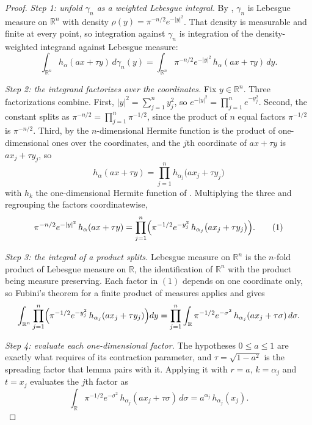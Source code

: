 \begin{proof}
\emph{Step 1: unfold $\gamma_n$ as a weighted Lebesgue integral.}
By , $\gamma_n$ is Lebesgue measure on $\mathbb{R}^n$ with
density $\rho(y) = \pi^{-n/2}e^{-|y|^2}$.  That density is measurable and finite
at every point, so integration against $\gamma_n$ is integration of the
density-weighted integrand against Lebesgue measure:
\[
  \int_{\mathbb{R}^n} h_\alpha(a x + \tau y)\, d\gamma_n(y)
    = \int_{\mathbb{R}^n} \pi^{-n/2} e^{-|y|^2}\, h_\alpha(a x + \tau y)\, dy .
\]

\emph{Step 2: the integrand factorizes over the coordinates.}
Fix $y \in \mathbb{R}^n$.  Three factorizations combine.  First,
$|y|^2 = \sum_{j=1}^n y_j^2$, so
$e^{-|y|^2} = \prod_{j=1}^n e^{-y_j^2}$.  Second, the constant splits as
$\pi^{-n/2} = \prod_{j=1}^n \pi^{-1/2}$, since the product of $n$ equal factors
$\pi^{-1/2}$ is $\pi^{-n/2}$.  Third, by  the
$n$-dimensional Hermite function is the product of one-dimensional ones over the
coordinates, and the $j$th coordinate of $a x + \tau y$ is $a x_j + \tau y_j$,
so
\[
  h_\alpha(a x + \tau y)
    = \prod_{j=1}^n h_{\alpha_j}\bigl(a x_j + \tau y_j\bigr)
\]
with $h_k$ the one-dimensional Hermite function of .
Multiplying the three and regrouping the factors coordinatewise,
\begin{equation*}
  \pi^{-n/2} e^{-|y|^2}\, h_\alpha(a x + \tau y)
    = \prod_{j=1}^n \Bigl( \pi^{-1/2} e^{-y_j^2}\,
        h_{\alpha_j}\bigl(a x_j + \tau y_j\bigr) \Bigr) . \tag{1}
\end{equation*}

\emph{Step 3: the integral of a product splits.}
Lebesgue measure on $\mathbb{R}^n$ is the $n$-fold product of Lebesgue measure on
$\mathbb{R}$, the identification of $\mathbb{R}^n$ with the product being measure
preserving.  Each factor in $(1)$ depends on one coordinate only, so Fubini's
theorem for a finite product of measures applies and gives
\[
  \int_{\mathbb{R}^n} \prod_{j=1}^n \Bigl( \pi^{-1/2} e^{-y_j^2}\,
      h_{\alpha_j}(a x_j + \tau y_j)\Bigr) dy
  = \prod_{j=1}^n \int_{\mathbb{R}} \pi^{-1/2} e^{-\sigma^2}\,
      h_{\alpha_j}(a x_j + \tau \sigma)\, d\sigma .
\]

\emph{Step 4: evaluate each one-dimensional factor.}
The hypotheses $0 \leq a \leq 1$ are exactly what
 requires of its contraction parameter, and
$\tau = \sqrt{1-a^2}$ is the spreading factor that lemma pairs with it.  Applying
it with $r = a$, $k = \alpha_j$ and $t = x_j$ evaluates the $j$th factor as
\[
  \int_{\mathbb{R}} \pi^{-1/2} e^{-\sigma^2}\,
      h_{\alpha_j}(a x_j + \tau \sigma)\, d\sigma
    = a^{\alpha_j}\, h_{\alpha_j}(x_j) .
\]


\end{proof}
